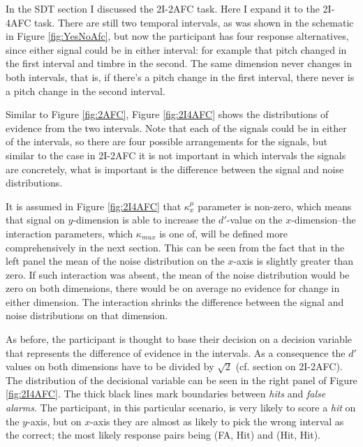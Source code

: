 \documentclass{article}\usepackage{knitr}
\begin{document}
In the SDT section I discussed the 2I-2AFC task. Here I expand it to the 2I-4AFC task. There are still two temporal intervals, as was shown in the schematic in Figure \ref{fig:YesNoAfc}, but now the participant has four response alternatives, since either signal could be in either interval: for example that pitch changed in the first interval and timbre in the second. The same dimension never changes in both intervals, that is, if there's a pitch change in the first interval, there never is a pitch change in the second interval.

Similar to Figure \ref{fig:2AFC}, Figure \ref{fig:2I4AFC} shows the distributions of evidence from the two intervals. Note that each of the signals could be in either of the intervals, so there are four possible arrangements for the signals, but similar to the case in 2I-2AFC it is not important in which intervals the signals are concretely, what is important is the difference between the signal and noise distributions. 

It is assumed in Figure \ref{fig:2I4AFC} that $\kappa_{x}^{\mu}$ parameter is non-zero, which means that signal on $y$-dimension is able to increase the $d'$-value on the $x$-dimension--the interaction parameters, which $\kappa_{mu x}$ is one of, will be defined more comprehensively in the next section. This can be seen from the fact that in the left panel the mean of the noise distribution on the $x$-axis is slightly greater than zero. If such interaction was absent, the mean of the noise distribution would be zero on both dimensions, there would be on average no evidence for change in either dimension. The interaction shrinks the difference between the signal and noise distributions on that dimension.

As before, the participant is thought to base their decision on a decision variable that represents the difference of evidence in the intervals. As a consequence the $d'$ values on both dimensions have to be divided by $\sqrt{2}$ (cf. section on 2I-2AFC). The distribution of the decisional variable can be seen in the right panel of Figure \ref{fig:2I4AFC}. The thick black lines mark boundaries between \textit{hits} and \textit{false alarms}. The participant, in this particular scenario, is very likely to score a \textit{hit} on the $y$-axis, but on $x$-axis they are almost as likely to pick the wrong interval as the correct; the most likely response pairs being (FA, Hit) and (Hit, Hit).
\end{document}
